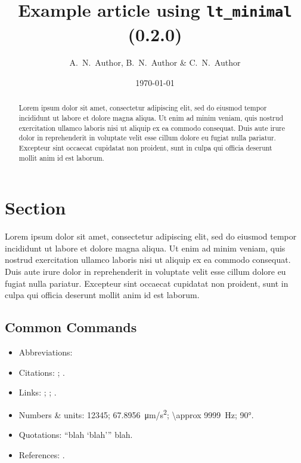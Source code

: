 \documentclass[a4paper, 11pt]{article}
\title{Example article using \texttt{lt\_minimal} (0.2.0)}
\author{A.~N.~Author, B.~N.~Author \& C.~N.~Author}
\date{\today}
\newcommand*{\printAffiliations}{}
\begin{document}
\maketitle
\printAffiliations

\begin{abstract} %

    Lorem ipsum dolor sit amet, consectetur adipiscing elit, sed do eiusmod
    tempor incididunt ut labore et dolore magna aliqua. Ut enim ad minim
    veniam, quis nostrud exercitation ullamco laboris nisi ut aliquip ex ea
    commodo consequat. Duis aute irure dolor in reprehenderit in voluptate
    velit esse cillum dolore eu fugiat nulla pariatur. Excepteur sint occaecat
    cupidatat non proident, sunt in culpa qui officia deserunt mollit anim id
    est laborum.

\end{abstract} %
\section{Section} %
\label{sec:Section}

Lorem ipsum dolor sit amet, consectetur adipiscing elit, sed do eiusmod tempor
incididunt ut labore et dolore magna aliqua. Ut enim ad minim veniam, quis
nostrud exercitation ullamco laboris nisi ut aliquip ex ea commodo consequat.
Duis aute irure dolor in reprehenderit in voluptate velit esse cillum dolore eu
fugiat nulla pariatur. Excepteur sint occaecat cupidatat non proident, sunt in
culpa qui officia deserunt mollit anim id est laborum.

\subsection{Common Commands} %

\begin{itemize}

    \item Abbreviations:
        \eg \ie \cf \etc

    \item Citations:
        \textcite{Bayes};
        \autocite{GravitationalWaves}.

    \item Links:
        ;
        ;
        .

    \item Numbers \& units:
        \num{12345};
        \SI{67.8956}{\um/\s^2};
        \SI{\approx 9999}{Hz};
        \ang{90}.

    \item Quotations:
        \enquote{blah \enquote{blah}} blah.

    \item References:
        .

\end{itemize}
\end{document}
